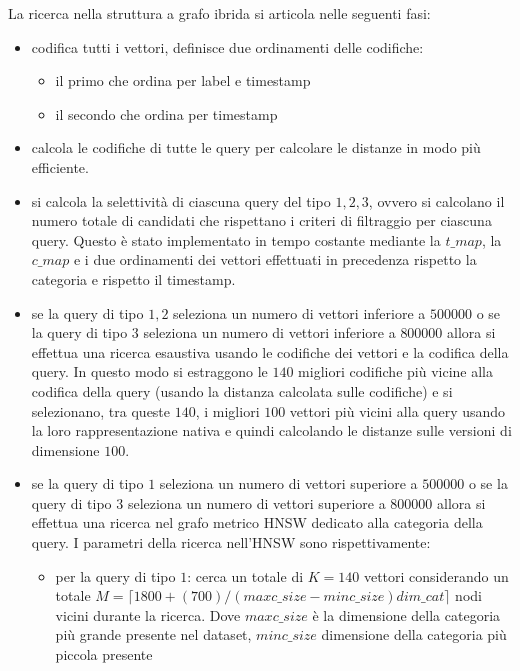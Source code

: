 La ricerca nella struttura a grafo ibrida si articola nelle seguenti fasi:
\begin{itemize}
    \item codifica tutti i vettori, definisce due ordinamenti delle codifiche:
    \begin{itemize}
        \item il primo che ordina per label e timestamp
        \item il secondo che ordina per timestamp
    \end{itemize}
    \item calcola le codifiche di tutte le query per calcolare le distanze in modo 
    più efficiente.
    \item si calcola la selettività di ciascuna query del tipo $1,2,3$, ovvero 
    si calcolano il numero totale di candidati che rispettano i criteri di filtraggio 
    per ciascuna query. Questo è stato implementato in tempo costante mediante la 
    $t\_map$, la $c\_map$ e i due ordinamenti dei vettori effettuati in precedenza rispetto 
    la categoria e rispetto il timestamp. 
    \item se la query di tipo $1,2$ seleziona un numero di vettori 
    inferiore a $500000$ o se la query di tipo $3$ seleziona un numero di vettori 
    inferiore a $800000$ allora si effettua una ricerca esaustiva usando le codifiche 
    dei vettori e la codifica della query. In questo modo si estraggono le $140$
    migliori codifiche più vicine alla codifica della query (usando la distanza 
    calcolata sulle codifiche) e si selezionano, tra queste $140$, i migliori $100$
    vettori più vicini alla query usando la loro rappresentazione nativa e quindi 
    calcolando le distanze sulle versioni di dimensione $100$.
    \item se la query di tipo $1$ seleziona un numero di vettori 
    superiore a $500000$ o se la query di tipo $3$ seleziona un numero di vettori 
    superiore a $800000$ allora si effettua una ricerca nel grafo metrico HNSW 
    dedicato alla categoria della query. I parametri della ricerca nell'HNSW sono
    rispettivamente:
    \begin{itemize}
        \item per la query di tipo $1$: cerca un totale di $K=140$ vettori considerando 
        un totale $M= \lceil1800+(700)/(maxc\_size - minc\_size)dim\_cat\rceil$ 
        nodi vicini durante la ricerca. Dove $maxc\_size$ è la dimensione della categoria 
        più grande presente 
        nel dataset, $minc\_size$ dimensione della categoria più piccola presente 

\end{itemize}
\end{itemize}
